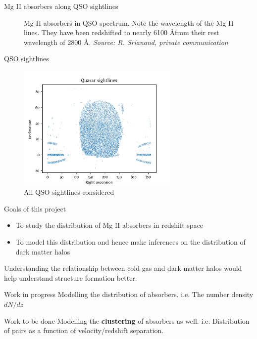 \documentclass{beamer}
\begin{document}
\begin{frame}[allowframebreaks]{Mg II absorbers along QSO sightlines}
\begin{figure}
				\caption{\tiny Mg II absorbers in QSO spectrum. Note the wavelength of the Mg II lines. They have been redshifted to nearly 6100 \AA from their rest wavelength of 2800 \AA. \emph{Source: R. Srianand, private communication}}
			\end{figure}
		\end{frame}
		\begin{frame}{QSO sightlines}
			\begin{figure}
				\includegraphics[width=0.7\textwidth]{qso_sky.png}
				\caption{\tiny All QSO sightlines considered}
				\label{fig:QSOs}
			\end{figure}
		\end{frame}
		\begin{frame}{Goals of this project}
			\begin{itemize}
				\item To study the distribution of Mg II absorbers in redshift space
				\item To model this distribution and hence make inferences on the distribution of dark matter halos
			\end{itemize}
			Understanding the relationship between cold gas and dark matter halos would help understand structure formation better.
			\begin{block}{Work in progress}
				Modelling the distribution of absorbers. i.e. The number density $dN/dz$
			\end{block}
			\begin{block}{Work to be done}
				Modelling the \textbf{clustering} of absorbers as well. i.e. Distribution of pairs as a function of velocity/redshift separation.
			\end{block}
		\end{frame}
\end{document}
